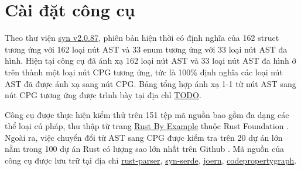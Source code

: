 \section{Cài đặt công cụ}

Theo thư viện \href{https://docs.rs/syn/2.0.87/syn/}{syn v2.0.87}, phiên bản hiện thời có định nghĩa của 162 struct tương ứng với 162 loại nút AST và 33 enum tương ứng với 33 loại nút AST đa hình.
Hiện tại công cụ đã ánh xạ 162 loại nút AST và 33 loại nút AST đa hình ở trên thành một loại nút CPG tương ứng, tức là 100\% định nghĩa các loại nút AST đã được ánh xạ sang nút CPG.
Bảng tổng hợp ánh xạ 1-1 từ nút AST sang nút CPG tương ứng được trình bày tại địa chỉ \href{TODO}{TODO}.

Công cụ được thực hiện kiểm thử trên 151 tệp mã nguồn bao gồm đa dạng các thể loại cú pháp, thu thập từ trang \href{https://doc.rust-lang.org/stable/rust-by-example/index.html}{Rust By Example} thuộc Rust Foundation \cite{rustlangRustFoundation}.
Ngoài ra, việc chuyển đổi từ AST sang CPG được kiểm tra trên 20 dự án lớn nằm trong 100 dự án Rust có lượng sao lớn nhất trên Github \cite {githubGithubRankingTop100RustmdMaster}.
Mã nguồn của công cụ được lưu trữ tại địa chỉ \href{https://github.com/congnghiahieu/rust-parser}{rust-parser}, \href{https://github.com/congnghiahieu/syn-serde}{syn-serde}, \href{https://github.com/congnghiahieu/joern}{joern}, \href{https://github.com/congnghiahieu/codepropertygraph}{codepropertygraph}.
